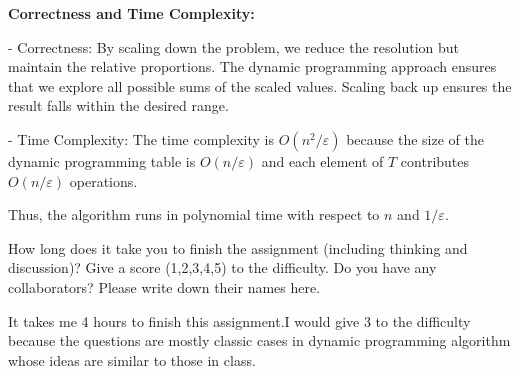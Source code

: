 \documentclass{oxmathproblems}
\begin{document}
\begin{questions}
\textbf{Correctness and Time Complexity:}

- Correctness: By scaling down the problem, we reduce the resolution but maintain the relative proportions. The dynamic programming approach ensures that we explore all possible sums of the scaled values. Scaling back up ensures the result falls within the desired range.

- Time Complexity: The time complexity is \(O(n^2 / \varepsilon)\) because the size of the dynamic programming table is \(O(n / \varepsilon)\) and each element of \(T\) contributes \(O(n / \varepsilon)\) operations.

Thus, the algorithm runs in polynomial time with respect to \(n\) and \(1/\varepsilon\).

  
\miquestion
How long does it take you to finish the assignment (including thinking and discussion)?
Give a score (1,2,3,4,5) to the difficulty.
Do you have any collaborators?
Please write down their names here.
 
It takes me 4 hours to finish this assignment.I
would give 3 to the difficulty because the questions are mostly classic cases in dynamic programming algorithm whose ideas are similar to those in class.
\end{questions}
\end{document}
